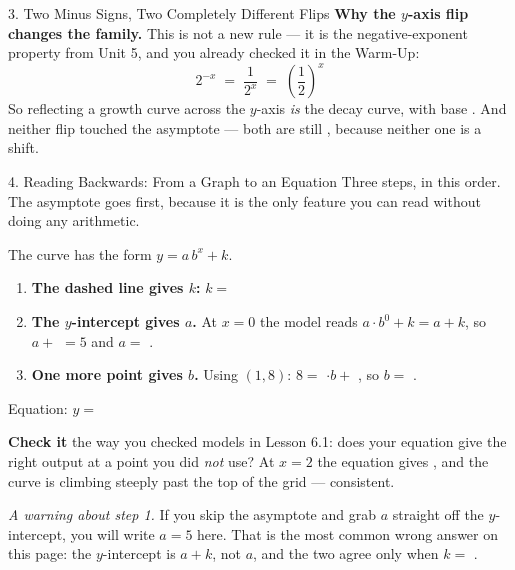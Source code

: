 \documentclass[10pt]{article}
\newcommand{\lgrid}[4]{%
  \draw[step=1, linegray!40, very thin] (#1,#3) grid (#2,#4);
  \draw[->, semithick, charcoal] (#1,0)--(#2,0) node[below right, font=\scriptsize]{$x$};
  \draw[->, semithick, charcoal] (0,#3)--(0,#4) node[left, font=\scriptsize]{$y$};}
\newcommand{\expgraph}[6]{\draw[very thick, forest, domain=#5:#6, samples=140, smooth]
  plot (\x,{(#1)*exp((#2)*((\x)-(#3)))+(#4)});}
\newcommand{\hasym}[3]{\draw[navy, dashed, semithick] (#1,#3)--(#2,#3);}
\begin{document}
\begin{notesbox}{3. Two Minus Signs, Two Completely Different Flips}
\vspace{2pt}
\textbf{Why the $y$-axis flip changes the family.} This is not a new rule --- it is the
negative-exponent property from Unit 5, and you already checked it in the Warm-Up:
\[
  2^{-x} \;=\; \frac{1}{2^{x}} \;=\; \left(\frac{1}{2}\right)^{x}
\]
So reflecting a growth curve across the $y$-axis \emph{is} the decay curve, with base
\blank{1.4cm}. And neither flip touched the asymptote --- both are still \blank{1.4cm}, because
neither one is a \blank{2.2cm} shift.
\end{notesbox}

\begin{notesbox}{4. Reading Backwards: From a Graph to an Equation}
Three steps, in this order. The asymptote goes first, because it is the only feature you can read
without doing any arithmetic.
\begin{center}
\begin{minipage}[c]{0.44\linewidth}
\centering
{}
\end{minipage}
\begin{minipage}[c]{0.52\linewidth}
\small
The curve has the form $y=a\,b^{x}+k$.
\begin{enumerate}[leftmargin=1.6em, itemsep=4pt]
  \item \textbf{The dashed line gives $k$:} \; $k=$ \blank{1.0cm}
  \item \textbf{The $y$-intercept gives $a$.} At $x=0$ the model reads $a\cdot b^{0}+k = a+k$, so
        $a+$ \blank{0.8cm} $=5$ and $a=$ \blank{1.0cm}.
  \item \textbf{One more point gives $b$.} Using $(1,8)$: \; $8=$ \blank{0.8cm}$\cdot b+$
        \blank{0.8cm}, so $b=$ \blank{1.0cm}.
\end{enumerate}
Equation: $y=$ \blank{3.0cm}
\end{minipage}
\end{center}

\vspace{2pt}
\textbf{Check it} the way you checked models in Lesson 6.1: does your equation give the right output
at a point you did \emph{not} use? At $x=2$ the equation gives \blank{2.2cm}, and the curve is
climbing steeply past the top of the grid --- consistent.

\vspace{3pt}
\emph{A warning about step 1.} If you skip the asymptote and grab $a$ straight off the $y$-intercept,
you will write $a=5$ here. That is the most common wrong answer on this page: the $y$-intercept is
$a+k$, not $a$, and the two agree only when $k=$ \blank{1.0cm}.
\end{notesbox}
\end{document}
